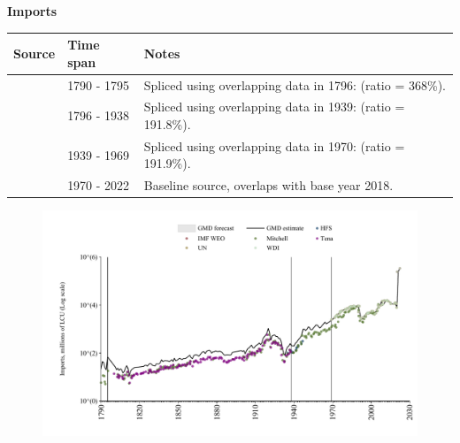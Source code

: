 \documentclass[12pt,a4paper,landscape]{article}
\begin{document}
\begin{adjustbox}{max totalsize={\paperwidth}{\paperheight},center}
\begin{minipage}[t][\textheight][t]{\textwidth}
\vspace*{0.5cm}
{}
\begin{center}
{\Large\bfseries Imports}
\end{center}
\vspace{0.5cm}
\begin{table}[H]
\centering
\small
\begin{tabular}{|l|l|l|}
\hline
\textbf{Source} & \textbf{Time span} & \textbf{Notes} \\
\hline
\rowcolor{white}\cite{Mitchell}& 1790 - 1795 &Spliced using overlapping data in 1796: (ratio = 368\%). \\
\rowcolor{lightgray}\cite{Tena}& 1796 - 1938 &Spliced using overlapping data in 1939: (ratio = 191.8\%). \\
\rowcolor{white}\cite{Mitchell}& 1939 - 1969 &Spliced using overlapping data in 1970: (ratio = 191.9\%). \\
\rowcolor{lightgray}\cite{WDI}& 1970 - 2022 &Baseline source, overlaps with base year 2018. \\
\hline
\end{tabular}
\end{table}
\begin{figure}[H]
\centering
\includegraphics[width=\textwidth,height=0.6\textheight,keepaspectratio]{graphs/CUB_imports.pdf}
\end{figure}
\end{minipage}
\end{adjustbox}
\end{document}
